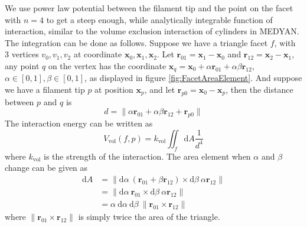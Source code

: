 \documentclass[main.tex]{subfiles}
\begin{document}
We use power law potential between the filament tip and the point on the facet with $n=4$ to get a steep enough, while analytically integrable function of interaction, similar to the volume exclusion interaction of cylinders in MEDYAN. The integration can be done as follows. Suppose we have a triangle facet $f$, with 3 vertices $v_0, v_1, v_2$ at coordinate $\bm{x}_0, \bm{x}_1, \bm{x}_2$. Let $\bm{r}_{01} = \bm{x}_1 - \bm{x}_0$ and $\bm{r}_{12} = \bm{x}_2 - \bm{x}_1$, any point $q$ on the vertex has the coordinate $\bm{x}_q = \bm{x}_0 + \alpha\bm{r}_{01} + \alpha\beta\bm{r}_{12}$, $\alpha\in[0,1], \beta\in[0,1]$, as displayed in figure \ref{fig:FacetAreaElement}. And suppose we have a filament tip $p$ at position $\bm{x}_p$, and let $\bm{r}_{p0} = \bm{x}_0 - \bm{x}_p$, then the distance between $p$ and $q$ is
\begin{equation}
d = \| \alpha\bm{r}_{01} + \alpha\beta\bm{r}_{12} + \bm{r}_{p0} \|
\end{equation}
The interaction energy can be written as
\begin{equation}
V_\text{vol}(f, p) = k_\text{vol} \iint_f \mathrm{d}A \frac1{d^4}
\label{eq:VolumeExclusionIntegral}
\end{equation}
where $k_\text{vol}$ is the strength of the interaction. The area element when $\alpha$ and $\beta$ change can be given as
\begin{equation}
\begin{aligned}
\mathrm{d}A &= \| \mathrm{d}\alpha\ \left(\bm{r}_{01} + \beta\bm{r}_{12}\right) \times \mathrm{d}\beta\ \alpha\bm{r}_{12} \|\\
&= \| \mathrm{d}\alpha\ \bm{r}_{01} \times \mathrm{d}\beta\ \alpha\bm{r}_{12} \|\\
&= \alpha\ \mathrm{d}\alpha\ \mathrm{d}\beta\ \| \bm{r}_{01} \times \bm{r}_{12} \|
\end{aligned}
\end{equation}
where $\| \bm{r}_{01} \times \bm{r}_{12} \|$ is simply twice the area of the triangle.
\end{document}
